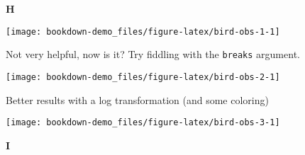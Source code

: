 \documentclass[]{book}
\newenvironment{Shaded}{\begin{snugshade}}{\end{snugshade}}
\newcommand{\DataTypeTok}[1]{\textcolor[rgb]{0.13,0.29,0.53}{#1}}
\newcommand{\KeywordTok}[1]{\textcolor[rgb]{0.13,0.29,0.53}{\textbf{#1}}}
\newcommand{\NormalTok}[1]{#1}
\newcommand{\OperatorTok}[1]{\textcolor[rgb]{0.81,0.36,0.00}{\textbf{#1}}}
\newcommand{\StringTok}[1]{\textcolor[rgb]{0.31,0.60,0.02}{#1}}
\begin{document}
\textbf{H}

\begin{Shaded}
\end{Shaded}

\begin{center}\texttt{[image: bookdown-demo\_files/figure-latex/bird-obs-1-1]} \end{center}

Not very helpful, now is it? Try fiddling with the \texttt{breaks} argument.

\begin{Shaded}
\end{Shaded}

\begin{center}\texttt{[image: bookdown-demo\_files/figure-latex/bird-obs-2-1]} \end{center}

Better results with a log transformation (and some coloring)

\begin{Shaded}
\end{Shaded}

\begin{center}\texttt{[image: bookdown-demo\_files/figure-latex/bird-obs-3-1]} \end{center}

\textbf{I}
\end{document}
